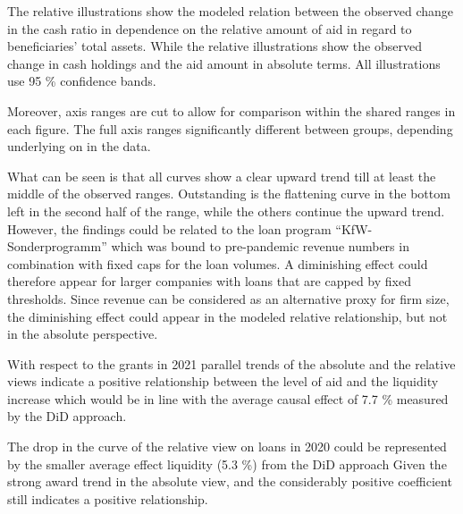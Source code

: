 The relative illustrations show the modeled relation between the observed change in the cash ratio in dependence on the relative amount of aid in regard to beneficiaries' total assets. While the relative illustrations show the observed change in cash holdings and the aid amount in absolute terms. All illustrations use 95 \% confidence bands. 

Moreover, axis ranges are cut to allow for comparison within the shared ranges in each figure. The full axis ranges significantly different between groups, depending underlying on in the data.

What can be seen is that all curves show a clear upward trend till at least the middle of the observed ranges. Outstanding is the flattening curve in the bottom left in the second half of the range, while the others continue the upward trend. However, the findings could be related to the loan program “KfW-Sonderprogramm” which was bound to pre-pandemic revenue numbers in combination with fixed caps for the loan volumes. A diminishing effect could therefore appear for larger companies with loans that are capped by fixed thresholds. Since revenue can be considered as an alternative proxy for firm size, the diminishing effect could appear in the modeled relative relationship, but not in the absolute perspective.

With respect to the grants in 2021 parallel trends of the absolute and the relative views indicate a positive relationship between the level of aid and the liquidity increase which would be in line with the average causal effect of 7.7 \% measured by the DiD approach. 

The drop in the curve of the relative view on loans in 2020 could be represented by the smaller average effect liquidity (5.3 \%) from the DiD approach Given the strong award trend in the absolute view, and the considerably positive coefficient still indicates a positive relationship.


